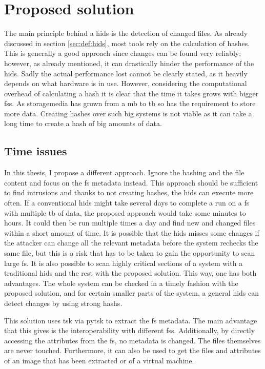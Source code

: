 \section{Proposed solution}
\label{sec:hids}

The main principle behind a \gls{hids} is the detection of changed files. As already discussed in section \ref{sec:def:hids}, most tools rely on the calculation of hashes. This is generally a good approach since changes can be found very reliably; however, as already mentioned, it can drastically hinder the performance of the \gls{hids}. Sadly the actual performance lost cannot be clearly stated, as it heavily depends on what hardware is in use. However, considering the computational overhead of calculating a \gls{hash} it is clear that the time it takes grows with bigger \glspl{fs}. As \gls{storagemedia} has grown from a \gls{mb} to \gls{tb} so has the requirement to store more data. Creating hashes over such big systems is not viable as it can take a long time to create a hash of big amounts of data. \cite{hash:slow, hash:veryslow, hash:speed}

\subsection{Time issues}

In this thesis, I propose a different approach. Ignore the hashing and the file content and focus on the \gls{fs} \gls{metadata} instead. This approach should be sufficient to find intrusions and thanks to not creating hashes, the \gls{hids} can execute more often. If a conventional \gls{hids} might take several days to complete a run on a \gls{fs} with multiple \gls{tb} of data, the proposed approach would take some minutes to hours. It could then be run multiple times a day and find new and changed files within a short amount of time. It is possible that the \gls{hids} misses some changes if the attacker can change all the relevant \gls{metadata} before the system rechecks the same file, but this is a risk that has to be taken to gain the opportunity to scan large \gls{fs}. It is also possible to scan highly critical sections of a system with a traditional \gls{hids} and the rest with the proposed solution. This way, one has both advantages. The whole system can be checked in a timely fashion with the proposed solution, and for certain smaller parts of the system, a general \gls{hids} can detect changes by using strong \glspl{hash}.

This solution uses \gls{tsk} via \gls{pytsk} to extract the \gls{fs} \gls{metadata}. The main advantage that this gives is the interoperability with different \glspl{fs}. Additionally, by directly accessing the attributes from the \gls{fs}, no \gls{metadata} is changed. The files themselves are never touched. Furthermore, it can also be used to get the files and attributes of an image that has been extracted or of a virtual machine. 

